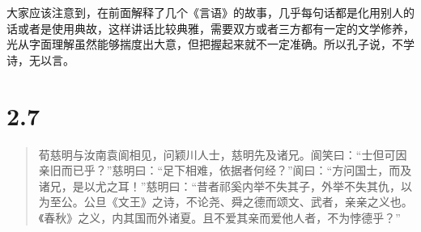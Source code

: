 \documentclass[]{book}
\begin{document}
大家应该注意到，在前面解释了几个《言语》的故事，几乎每句话都是化用别人的话或者是使用典故，这样讲话比较典雅，需要双方或者三方都有一定的文学修养，光从字面理解虽然能够揣度出大意，但把握起来就不一定准确。所以孔子说，不学诗，无以言。

\section{2.7}\label{section-53}

\begin{quote}
荀慈明与汝南袁阆相见，问颖川人士，慈明先及诸兄。阆笑曰：``士但可因亲旧而已乎？''慈明曰：``足下相难，依据者何经？''阆曰：``方问国士，而及诸兄，是以尤之耳！''慈明曰：``昔者祁奚内举不失其子，外举不失其仇，以为至公。公旦《文王》之诗，不论尧、舜之德而颂文、武者，亲亲之义也。《春秋》之义，内其国而外诸夏。且不爱其亲而爱他人者，不为悖德乎？''
\end{quote}
\end{document}
